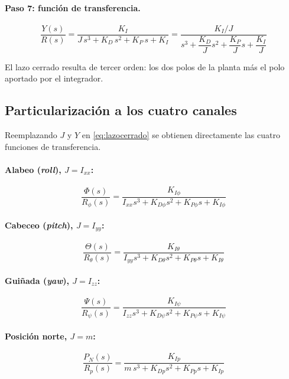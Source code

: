 \documentclass[11pt,a4paper]{article}
\begin{document}
\paragraph{Paso 7: función de transferencia.}
\begin{equation}
\boxed{\;
\frac{Y(s)}{R(s)}=\frac{K_I}{J\,s^{3}+K_D\,s^{2}+K_P\,s+K_I}
=\frac{K_I/J}{s^{3}+\dfrac{K_D}{J}s^{2}+\dfrac{K_P}{J}s+\dfrac{K_I}{J}} \;}
\label{eq:lazocerrado}
\end{equation}

El lazo cerrado resulta de tercer orden: los dos polos de la planta más el polo
aportado por el integrador.

\subsection{Particularización a los cuatro canales}

Reemplazando $J$ y $Y$ en \eqref{eq:lazocerrado} se obtienen directamente las
cuatro funciones de transferencia.

\paragraph{Alabeo (\emph{roll}), $J=I_{xx}$:}
\begin{equation}
\boxed{\;\frac{\Phi(s)}{R_\phi(s)}
=\frac{K_{I\phi}}{I_{xx}s^{3}+K_{D\phi}s^{2}+K_{P\phi}s+K_{I\phi}}\;}
\end{equation}

\paragraph{Cabeceo (\emph{pitch}), $J=I_{yy}$:}
\begin{equation}
\boxed{\;\frac{\Theta(s)}{R_\theta(s)}
=\frac{K_{I\theta}}{I_{yy}s^{3}+K_{D\theta}s^{2}+K_{P\theta}s+K_{I\theta}}\;}
\end{equation}

\paragraph{Guiñada (\emph{yaw}), $J=I_{zz}$:}
\begin{equation}
\boxed{\;\frac{\Psi(s)}{R_\psi(s)}
=\frac{K_{I\psi}}{I_{zz}s^{3}+K_{D\psi}s^{2}+K_{P\psi}s+K_{I\psi}}\;}
\end{equation}

\paragraph{Posición norte, $J=m$:}
\begin{equation}
\boxed{\;\frac{P_N(s)}{R_{p}(s)}
=\frac{K_{Ip}}{m\,s^{3}+K_{Dp}s^{2}+K_{Pp}s+K_{Ip}}\;}
\end{equation}
\end{document}
